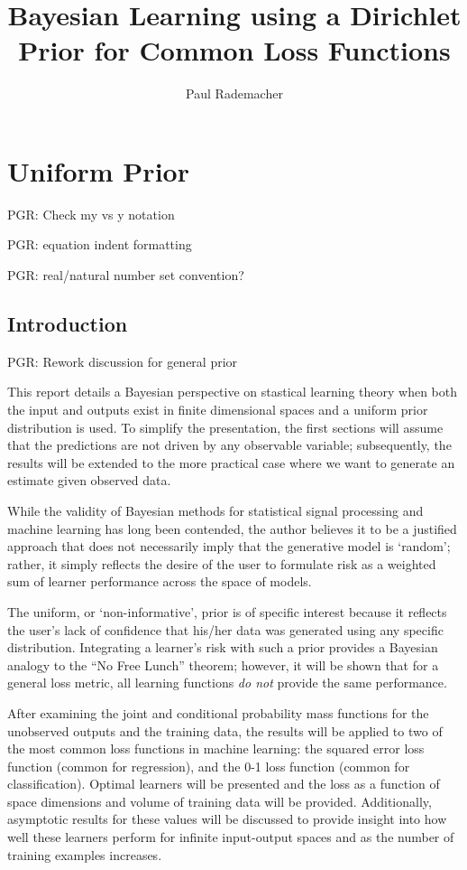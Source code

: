 \documentclass[12pt]{report}
\title{Bayesian Learning using a Dirichlet Prior for Common Loss Functions}
\author{Paul Rademacher}
\begin{document}
\maketitle
\tableofcontents

\chapter{Uniform Prior}

PGR: Check my vs y notation

PGR: equation indent formatting

PGR: real/natural number set convention?


\section{Introduction}

PGR: Rework discussion for general prior



This report details a Bayesian perspective on stastical learning theory when both the input and outputs exist in finite dimensional spaces and a uniform prior distribution is used. To simplify the presentation, the first sections will assume that the predictions are not driven by any observable variable; subsequently, the results will be extended to the more practical case where we want to generate an estimate given observed data.

While the validity of Bayesian methods for statistical signal processing and machine learning has long been contended, the author believes it to be a justified approach that does not necessarily imply that the generative model is `random'; rather, it simply reflects the desire of the user to formulate risk as a weighted sum of learner performance across the space of models. 

The uniform, or `non-informative', prior is of specific interest because it reflects the user's lack of confidence that his/her data was generated using any specific distribution. Integrating a learner's risk with such a prior provides a Bayesian analogy to the ``No Free Lunch'' theorem; however, it will be shown that for a general loss metric, all learning functions \emph{do not} provide the same performance.

After examining the joint and conditional probability mass functions for the unobserved outputs and the training data, the results will be applied to two of the most common loss functions in machine learning: the squared error loss function (common for regression), and the 0-1 loss function (common for classification). Optimal learners will be presented and the loss as a function of space dimensions and volume of training data will be provided. Additionally, asymptotic results for these values will be discussed to provide insight into how well these learners perform for infinite input-output spaces and as the number of training examples increases. 
\end{document}
